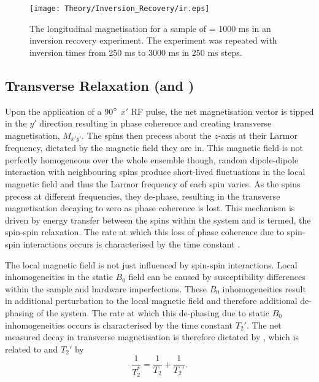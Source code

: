\begin{figure}[H]
	\centering
	\texttt{[image: Theory/Inversion\_Recovery/ir.eps]}
	\caption{The longitudinal magnetisation for a sample of \tone = 1000 ms in an inversion recovery experiment. The experiment was repeated with inversion times from 250 ms to 3000 ms in 250 ms steps.}
	\label{fig:theory_inversion_recovery}	
\end{figure}
\subsection{Transverse Relaxation (\ttwo and \ttwostar)}
\label{subsec:theory_t2}
Upon the application of a 90$\degree$ $x'$ \ac{RF} pulse, the net magnetisation vector is tipped in the $y'$ direction resulting in phase coherence and creating transverse magnetisation, $M_{x'y'}$. The spins then precess about the $z$-axis at their Larmor frequency, dictated by the magnetic field they are in. This magnetic field is not perfectly homogeneous over the whole ensemble though, random dipole-dipole interaction with neighbouring spins produce short-lived fluctuations in the local magnetic field and thus the Larmor frequency of each spin varies. As the spins precess at different frequencies, they de-phase, resulting in the transverse magnetisation decaying to zero as phase coherence is lost. This mechanism is driven by energy transfer between the spins within the system and is termed, the spin-spin relaxation. The rate at which this loss of phase coherence due to spin-spin interactions occurs is characterised by the time constant \ttwo.

\newpage
The local magnetic field is not just influenced by spin-spin interactions. Local inhomogeneities in the static $B_0$ field can be caused by susceptibility differences within the sample and hardware imperfections. These $B_0$  inhomogeneities result in additional perturbation to the local magnetic field and therefore additional de-phasing of the system. The rate at which this de-phasing due to static $B_0$ inhomogeneities occurs is characterised by the time constant $T_2'$. The net measured decay in transverse magnetisation is therefore dictated by \ttwostar, which is related to \ttwo and $T_2'$ by
\begin{equation}
\frac{1}{T_2^*} = \frac{1}{T_2} + \frac{1}{T_2'}.
\end{equation}
